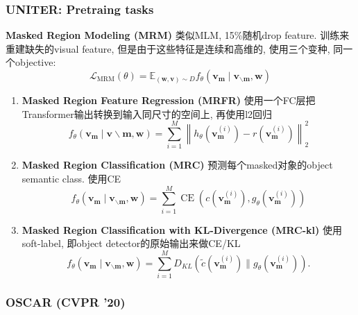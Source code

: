 \documentclass{beamer}
\newcommand{\bt}[1]{\textbf{#1}}
\begin{document}
\begin{frame}
    \frametitle{UNITER: Pretraing tasks}
    \footnotesize{
    \bt{Masked Region Modeling (MRM)} 
    类似MLM, 15\%随机drop feature. 训练来重建缺失的visual feature, 但是由于这些特征是连续和高维的, 使用三个变种, 同一个objective:
    \begin{equation}
        \mathcal{L}_{\mathrm{MRM}}(\theta)=\mathbb{E}_{(\mathbf{w}, \mathbf{v}) \sim D} f_{\theta}\left(\mathbf{v}_{\mathbf{m}} \mid \mathbf{v}_{\backslash \mathbf{m}}, \mathbf{w}\right)
    \end{equation}
    \begin{enumerate}
        \item \bt{Masked Region Feature Regression (MRFR)} 使用一个FC层把Transformer输出转换到输入同尺寸的空间上, 再使用l2回归
        \begin{equation}
            f_{\theta}\left(\mathbf{v}_{\mathbf{m}} \mid \mathbf{v} \backslash \mathbf{m}, \mathbf{w}\right)=\sum_{i=1}^{M}\left\|h_{\theta}\left(\mathbf{v}_{\mathbf{m}}^{(i)}\right)-r\left(\mathbf{v}_{\mathbf{m}}^{(i)}\right)\right\|_{2}^{2}
        \end{equation}
        \item \bt{Masked  Region  Classification  (MRC)} 预测每个masked对象的object semantic class. 使用CE
        \begin{equation}
            f_{\theta}\left(\mathbf{v}_{\mathbf{m}} \mid \mathbf{v}_{\backslash \mathbf{m}}, \mathbf{w}\right)=\sum_{i=1}^{M} \operatorname{CE}\left(c\left(\mathbf{v}_{\mathbf{m}}^{(i)}\right), g_{\theta}\left(\mathbf{v}_{\mathbf{m}}^{(i)}\right)\right)
        \end{equation}
        \item \bt{Masked  Region  Classification  with  KL-Divergence  (MRC-kl)} 使用soft-label, 即object detector的原始输出来做CE/KL
        \begin{equation}
            f_{\theta}\left(\mathbf{v}_{\mathbf{m}} \mid \mathbf{v}_{\backslash \mathbf{m}}, \mathbf{w}\right)=\sum_{i=1}^{M} D_{K L}\left(\tilde{c}\left(\mathbf{v}_{\mathbf{m}}^{(i)}\right) \| g_{\theta}\left(\mathbf{v}_{\mathbf{m}}^{(i)}\right)\right) .
        \end{equation}
    \end{enumerate}
    }

\end{frame}

\subsubsection{OSCAR (CVPR '20)}
\end{document}
